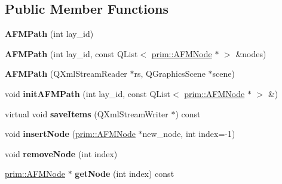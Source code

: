 \subsection*{Public Member Functions}
\begin{DoxyCompactItemize}
\item 
{\bfseries A\+F\+M\+Path} (int lay\+\_\+id)\hypertarget{classprim_1_1AFMPath_ac83ca90f162d6d97cbbc2642a0297107}{}\label{classprim_1_1AFMPath_ac83ca90f162d6d97cbbc2642a0297107}

\item 
{\bfseries A\+F\+M\+Path} (int lay\+\_\+id, const Q\+List$<$ \hyperlink{classprim_1_1AFMNode}{prim\+::\+A\+F\+M\+Node} $\ast$ $>$ \&nodes)\hypertarget{classprim_1_1AFMPath_a0ba1cedaa14e927648dd9904dc5eff2f}{}\label{classprim_1_1AFMPath_a0ba1cedaa14e927648dd9904dc5eff2f}

\item 
{\bfseries A\+F\+M\+Path} (Q\+Xml\+Stream\+Reader $\ast$rs, Q\+Graphics\+Scene $\ast$scene)\hypertarget{classprim_1_1AFMPath_a058f52115086179cc35e4de5202737ba}{}\label{classprim_1_1AFMPath_a058f52115086179cc35e4de5202737ba}

\item 
void {\bfseries init\+A\+F\+M\+Path} (int lay\+\_\+id, const Q\+List$<$ \hyperlink{classprim_1_1AFMNode}{prim\+::\+A\+F\+M\+Node} $\ast$ $>$ \&)\hypertarget{classprim_1_1AFMPath_a1a7eed6a13b583f3446652deb6791ada}{}\label{classprim_1_1AFMPath_a1a7eed6a13b583f3446652deb6791ada}

\item 
virtual void {\bfseries save\+Items} (Q\+Xml\+Stream\+Writer $\ast$) const \hypertarget{classprim_1_1AFMPath_a1d295e06021d0d0592131a49a2c0627c}{}\label{classprim_1_1AFMPath_a1d295e06021d0d0592131a49a2c0627c}

\item 
void {\bfseries insert\+Node} (\hyperlink{classprim_1_1AFMNode}{prim\+::\+A\+F\+M\+Node} $\ast$new\+\_\+node, int index=-\/1)\hypertarget{classprim_1_1AFMPath_ac4b4d5deb759bf7628f6de3934b5dae3}{}\label{classprim_1_1AFMPath_ac4b4d5deb759bf7628f6de3934b5dae3}

\item 
void {\bfseries remove\+Node} (int index)\hypertarget{classprim_1_1AFMPath_a4fb597c2b686166ebc5d3191f870d2b1}{}\label{classprim_1_1AFMPath_a4fb597c2b686166ebc5d3191f870d2b1}

\item 
\hyperlink{classprim_1_1AFMNode}{prim\+::\+A\+F\+M\+Node} $\ast$ {\bfseries get\+Node} (int index) const \hypertarget{classprim_1_1AFMPath_a21a57b453b79a8f613632f1a22b45254}{}\label{classprim_1_1AFMPath_a21a57b453b79a8f613632f1a22b45254}


\end{DoxyCompactItemize}
